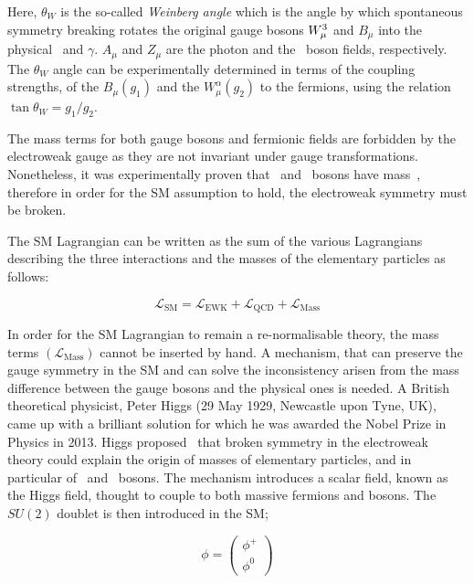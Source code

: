 			\noindent Here, $\theta_W$ is the so-called \emph{Weinberg angle} which is the angle by which spontaneous symmetry breaking rotates the original gauge bosons $W_{\mu}^3$ and $B_{\mu}$ into the physical \Zboson\ and $\gamma$. $A_\mu$ and $Z_\mu$ are the photon and the \Zboson\ boson fields, respectively. The $\theta_W$ angle can be experimentally determined in terms of the coupling strengths, of the $B_{\mu}(g_1)$ and the $W_{\mu}^\alpha (g_2)$ to the fermions, using the relation $\tan\theta_W = g_1 / g_2 $. 

			The mass terms for both gauge bosons and fermionic fields are forbidden by the electroweak gauge as they are not invariant under gauge transformations. Nonetheless, it was experimentally proven that \Wboson\ and \Zboson\ bosons have mass~\cite{Pich2012}, therefore in order for the \ac{SM} assumption to hold, the electroweak symmetry must be broken. 

			The \ac{SM} Lagrangian can be written as the sum of the various Lagrangians describing the three interactions and the masses of the elementary particles as follows:

			\begin{equation}
			\label{eq:SM_Lagrangian}
				\mathcal{L_{\mathrm{SM}}} = \mathcal{L_{\mathrm{EWK}}} + \mathcal{L_{\mathrm{QCD}}} + \mathcal{L_{\mathrm{Mass}}}
			\end{equation}

			\noindent In order for the \ac{SM} Lagrangian to remain a re-normalisable theory, the mass terms $\left ( \mathcal{L_{\mathrm{Mass}}} \right )$ cannot be inserted by hand. A mechanism, that can preserve the gauge symmetry in the \ac{SM} and can solve the inconsistency arisen from the mass difference between the gauge bosons and the physical ones is needed. A British theoretical physicist, Peter Higgs (29 May 1929, Newcastle upon Tyne, UK), came up with a brilliant solution for which he was awarded the Nobel Prize in Physics in 2013. Higgs proposed~\cite{Higgs1964} that broken symmetry in the electroweak theory could explain the origin of masses of elementary particles, and in particular of \Wboson\ and \Zboson\ bosons. The mechanism introduces a scalar field, known as the Higgs field, thought to couple to both massive fermions and bosons. The $SU(2)$ doublet is then introduced in the \ac{SM};

			\begin{equation}
			\label{eq:Higgs_field}
				\phi = 
				\begin{pmatrix}
					\phi^+ \\ \phi^0
				\end{pmatrix} 
			\end{equation}

